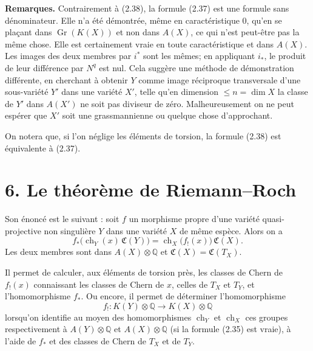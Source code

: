 \documentclass[11pt]{article}
\newcommand{\Gr}{\operatorname{Gr}}
\newcommand{\ch}{\operatorname{ch}}
\newcommand{\RRR}{\mathrm{RRR}}
\providecommand{\ch}{\operatorname{ch}}
\providecommand{\Gr}{\operatorname{Gr}}
\providecommand{\Gr}{\operatorname{G}}
\begin{document}
\textbf{Remarques.} Contrairement à (2.38), la formule (2.37) est une formule sans dénominateur. Elle n'a été démontrée, même en caractéristique $0$, qu'en se plaçant dans $\Gr(K(X))$ et non dans $A(X)$, ce qui n'est peut-être pas la même chose. Elle est certainement vraie en toute caractéristique et dans $A(X)$. Les images des deux membres par $i^*$ sont les mêmes; en appliquant $i_*$, le produit de leur différence par $N^q$ est nul. Cela suggère une méthode de démonstration différente, en cherchant à obtenir $Y$ comme image réciproque transversale d'une sous-variété $Y'$ dans une variété $X'$, telle qu'en dimension $\leq n=\dim X$ la classe de $Y'$ dans $A(X')$ ne soit pas diviseur de zéro. Malheureusement on ne peut espérer que $X'$ soit une grassmannienne ou quelque chose d'approchant.

On notera que, si l'on néglige les éléments de torsion, la formule (2.38) est équivalente à (2.37).




\providecommand{\cS}{\mathcal S}
\providecommand{\cD}{\mathcal D}
\providecommand{\cE}{\mathscr E}
\providecommand{\cG}{\mathscr G}
\providecommand{\cL}{\mathscr L}
\providecommand{\cM}{\mathscr M}
\providecommand{\cP}{\mathscr P}
\providecommand{\cK}{\mathcal K}
\providecommand{\Db}{\mathrm D}
\providecommand{\Kb}{\mathrm K}
\providecommand{\Trc}{\operatorname{Tr}}
\providecommand{\ob}{\operatorname{ob}}
\providecommand{\Coh}{\operatorname{Coh}}
\providecommand{\Cone}{\operatorname{Cone}}
\providecommand{\im}{\operatorname{Im}}
\providecommand{\Id}{\operatorname{Id}}
\providecommand{\RR}{\mathrm{R.R.}}
\providecommand{\RRR}{\mathrm{R.R.R.}}
\providecommand{\GrR}{\mathrm{G}}
\providecommand{\pr}{\operatorname{pr}}


\section*{6. Le théorème de Riemann--Roch}

Son énoncé est le suivant : soit \(f\) un morphisme propre d'une variété quasi-projective non singulière \(Y\) dans une variété \(X\) de même espèce. Alors on a
\begin{equation}\tag{2.39}
 f_*\bigl(\ch_Y(x)\,\mathfrak C(Y)\bigr)
 =
 \ch_X\bigl(f_!(x)\bigr)\,\mathfrak C(X).
\end{equation}
Les deux membres sont dans \(A(X)\otimes\mathbb Q\) et \(\mathfrak C(X)=\mathfrak C(T_X)\).

Il permet de calculer, aux éléments de torsion près, les classes de Chern de \(f_!(x)\) connaissant les classes de Chern de \(x\), celles de \(T_X\) et \(T_Y\), et l'homomorphisme \(f_*\). Ou encore, il permet de déterminer l'homomorphisme
\[
  f_!:K(Y)\otimes\mathbb Q \longrightarrow K(X)\otimes\mathbb Q
\]
lorsqu'on identifie au moyen des homomorphismes \(\ch_Y\) et \(\ch_X\) ces groupes respectivement à \(A(Y)\otimes\mathbb Q\) et \(A(X)\otimes\mathbb Q\) (si la formule (2.35) est vraie), à l'aide de \(f_*\) et des classes de Chern de \(T_X\) et de \(T_Y\).
\end{document}

